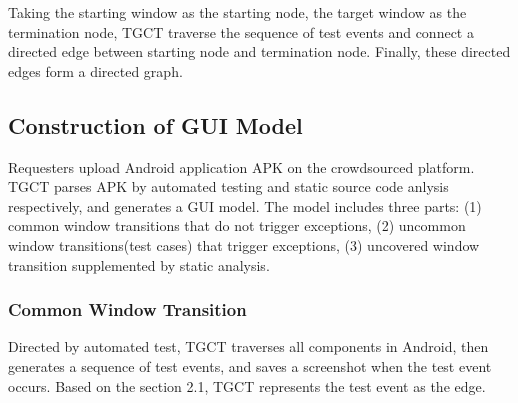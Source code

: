 Taking the starting window as the starting node, the target window as the termination node, TGCT traverse the sequence of test events and connect a directed edge between starting node and termination node. Finally, these directed edges form a directed graph.



\subsection{Construction of GUI Model}
Requesters upload Android application APK on the crowdsourced platform. TGCT parses APK by automated testing and static source code anlysis respectively, and generates a GUI model. The model includes three parts:
(1) common window transitions that do not trigger exceptions, (2) uncommon window transitions(test cases) that trigger exceptions, (3) uncovered window transition supplemented by static analysis.

\subsubsection{Common Window Transition}
Directed by automated test, TGCT traverses all components in Android, then generates a sequence of test events, and saves a screenshot when the test event occurs. Based on the section 2.1, TGCT represents the test event as the edge.


